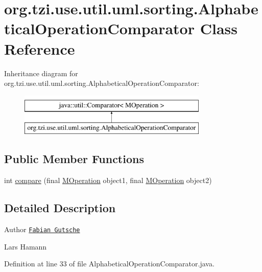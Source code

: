 \hypertarget{classorg_1_1tzi_1_1use_1_1util_1_1uml_1_1sorting_1_1_alphabetical_operation_comparator}{\section{org.\-tzi.\-use.\-util.\-uml.\-sorting.\-Alphabetical\-Operation\-Comparator Class Reference}
\label{classorg_1_1tzi_1_1use_1_1util_1_1uml_1_1sorting_1_1_alphabetical_operation_comparator}
}
Inheritance diagram for org.\-tzi.\-use.\-util.\-uml.\-sorting.\-Alphabetical\-Operation\-Comparator\-:\begin{figure}[H]
\begin{center}
\leavevmode
\includegraphics[height=2.000000cm]{classorg_1_1tzi_1_1use_1_1util_1_1uml_1_1sorting_1_1_alphabetical_operation_comparator}
\end{center}
\end{figure}
\subsection*{Public Member Functions}
\begin{DoxyCompactItemize}
\item 
int \hyperlink{classorg_1_1tzi_1_1use_1_1util_1_1uml_1_1sorting_1_1_alphabetical_operation_comparator_a16a7ecdb3738158b7d13b569ba0746f5}{compare} (final \hyperlink{classorg_1_1tzi_1_1use_1_1uml_1_1mm_1_1_m_operation}{M\-Operation} object1, final \hyperlink{classorg_1_1tzi_1_1use_1_1uml_1_1mm_1_1_m_operation}{M\-Operation} object2)
\end{DoxyCompactItemize}


\subsection{Detailed Description}
\begin{DoxyAuthor}{Author}
\href{mailto:gutsche@tzi.de}{\tt Fabian Gutsche} 

Lars Hamann 
\end{DoxyAuthor}


Definition at line 33 of file Alphabetical\-Operation\-Comparator.\-java.



